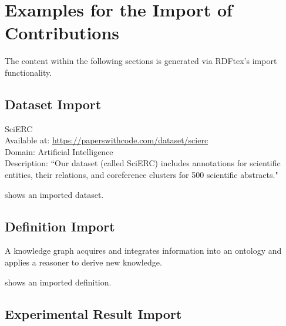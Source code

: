
\section{Examples for the Import of Contributions}

The content within the following sections is generated via RDFtex's import functionality.

\subsection{Dataset Import}

\begin{dataset}
SciERC~\cite{DBLP:conf/emnlp/LuanHOH18}\\
Available at: \url{https://paperswithcode.com/dataset/scierc}\\
Domain: Artificial Intelligence\\
Description: ``Our dataset (called SciERC) includes annotations for scientific entities, their relations, and coreference clusters for 500 scientific abstracts."~\cite{DBLP:conf/emnlp/LuanHOH18}
\label{dataset:scierc}
\end{dataset}
 shows an imported dataset.

\subsection{Definition Import}

\begin{definition}
\label{def:knowledge-graph}
A knowledge graph acquires and integrates information into an ontology and applies a reasoner to derive new knowledge.
\end{definition}
 shows an imported definition.

\subsection{Experimental Result Import}

